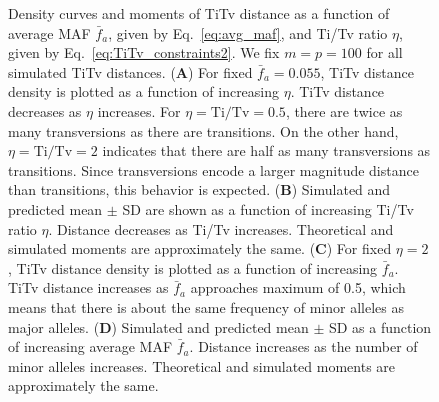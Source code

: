 \documentclass[aoas]{imsart}
\begin{document}
\begin{figure}[H]
	\centering
	\caption{Density curves and moments of TiTv distance as a function of average MAF $\bar{f}_a$, given by Eq.~\ref{eq:avg_maf}, and Ti/Tv ratio $\eta$, given by Eq.~\ref{eq:TiTv_constraints2}. We fix $m=p=100$ for all simulated TiTv distances. (\textbf{A}) For fixed $\bar{f}_a=0.055$, TiTv distance density is plotted as a function of increasing $\eta$. TiTv distance decreases as $\eta$ increases. For $\eta=\text{Ti/Tv}=0.5$, there are twice as many transversions as there are transitions. On the other hand, $\eta=\text{Ti/Tv}=2$ indicates that there are half as many transversions as transitions. Since transversions encode a larger magnitude distance than transitions, this behavior is expected. (\textbf{B}) Simulated and predicted mean $\pm$ SD are shown as a function of increasing Ti/Tv ratio $\eta$. Distance decreases as Ti/Tv increases. Theoretical and simulated moments are approximately the same. (\textbf{C}) For fixed $\eta=2$, TiTv distance density is plotted as a function of increasing $\bar{f}_a$. TiTv distance increases as $\bar{f}_a$ approaches maximum of 0.5, which means that there is about the same frequency of minor alleles as major alleles. (\textbf{D}) Simulated and predicted mean $\pm$ SD as a function of increasing average MAF $\bar{f}_a$. Distance increases as the number of minor alleles increases. Theoretical and simulated moments are approximately the same.}\label{fig:TiTv_ridge}
\end{figure}
\end{document}
